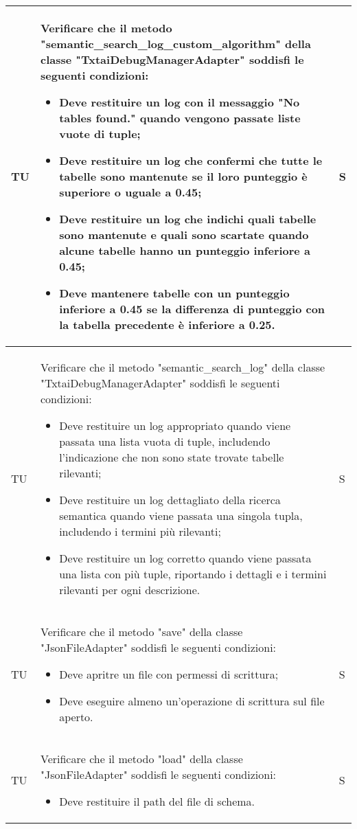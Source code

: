 \begin{adjustwidth}{-0.5cm}{-0.5cm}
\begin{longtable}{|P{1.5cm}|>{\raggedright}P{9.5cm}|>{\arraybackslash}P{1.5cm}|}
		\hline TU & Verificare che il metodo "semantic\_search\_log\_custom\_algorithm" della classe "TxtaiDebugManagerAdapter" soddisfi le seguenti condizioni:
		\begin{itemize}
			\item Deve restituire un log con il messaggio "No tables found." quando vengono passate liste vuote di tuple;
			\item Deve restituire un log che confermi che tutte le tabelle sono mantenute se il loro punteggio è superiore o uguale a 0.45;
			\item Deve restituire un log che indichi quali tabelle sono mantenute e quali sono scartate quando alcune tabelle hanno un punteggio inferiore a 0.45;
			\item Deve mantenere tabelle con un punteggio inferiore a 0.45 se la differenza di punteggio con la tabella precedente è inferiore a 0.25.
		\end{itemize} & S \\

		\hline TU & Verificare che il metodo "semantic\_search\_log" della classe "TxtaiDebugManagerAdapter" soddisfi le seguenti condizioni:
		\begin{itemize}
			\item Deve restituire un log appropriato quando viene passata una lista vuota di tuple, includendo l'indicazione che non sono state trovate tabelle rilevanti;
			\item Deve restituire un log dettagliato della ricerca semantica quando viene passata una singola tupla, includendo i termini più rilevanti;
			\item Deve restituire un log corretto quando viene passata una lista con più tuple, riportando i dettagli e i termini rilevanti per ogni descrizione.
		\end{itemize} & S \\

		\hline TU & Verificare che il metodo "save" della classe "JsonFileAdapter" soddisfi le seguenti condizioni:
		\begin{itemize}
			\item Deve apritre un file con permessi di scrittura;
			\item Deve eseguire almeno un'operazione di scrittura sul file aperto.
		\end{itemize} & S \\

		\hline TU & Verificare che il metodo "load" della classe "JsonFileAdapter" soddisfi le seguenti condizioni:
		\begin{itemize}
			\item Deve restituire il path del file di schema.
		\end{itemize} & S \\


\end{longtable}
\end{adjustwidth}
